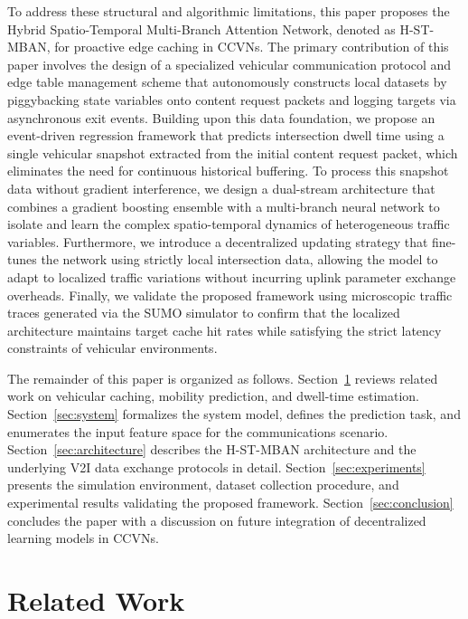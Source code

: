 \documentclass[journal]{IEEEtran}
\begin{document}
To address these structural and algorithmic limitations, this paper proposes the Hybrid Spatio-Temporal Multi-Branch Attention Network, denoted as H-ST-MBAN, for proactive edge caching in CCVNs. The primary contribution of this paper involves the design of a specialized vehicular communication protocol and edge table management scheme that autonomously constructs local datasets by piggybacking state variables onto content request packets and logging targets via asynchronous exit events. Building upon this data foundation, we propose an event-driven regression framework that predicts intersection dwell time using a single vehicular snapshot extracted from the initial content request packet, which eliminates the need for continuous historical buffering. To process this snapshot data without gradient interference, we design a dual-stream architecture that combines a gradient boosting ensemble with a multi-branch neural network to isolate and learn the complex spatio-temporal dynamics of heterogeneous traffic variables. Furthermore, we introduce a decentralized updating strategy that fine-tunes the network using strictly local intersection data, allowing the model to adapt to localized traffic variations without incurring uplink parameter exchange overheads. Finally, we validate the proposed framework using microscopic traffic traces generated via the SUMO simulator to confirm that the localized architecture maintains target cache hit rates while satisfying the strict latency constraints of vehicular environments.

The remainder of this paper is organized as follows.
Section~\ref{sec:related} reviews related work on vehicular caching, mobility prediction, and dwell-time estimation.
Section~\ref{sec:system} formalizes the system model, defines the prediction task, and enumerates the input feature space for the communications scenario.
Section~\ref{sec:architecture} describes the H-ST-MBAN architecture and the underlying V2I data exchange protocols in detail.
Section~\ref{sec:experiments} presents the simulation environment, dataset collection procedure, and experimental results validating the proposed framework.
Section~\ref{sec:conclusion} concludes the paper with a discussion on future integration of decentralized learning models in CCVNs.

\section{Related Work}\label{sec:related}
\end{document}
